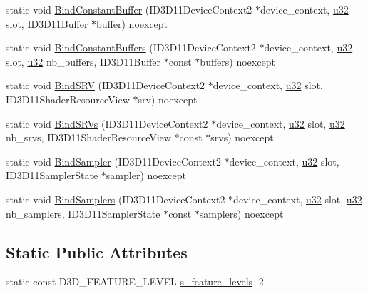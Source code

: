 \begin{DoxyCompactItemize}
\item 
static void \hyperlink{structmage_1_1_pipeline_ab09c3e39d69dc1faf85b290ba457526e}{Bind\+Constant\+Buffer} (I\+D3\+D11\+Device\+Context2 $\ast$device\+\_\+context, \hyperlink{namespacemage_af2b398bf98eb10351f49cad73fe2cc73}{u32} slot, I\+D3\+D11\+Buffer $\ast$buffer) noexcept
\item 
static void \hyperlink{structmage_1_1_pipeline_a6e6c99365ad6fb786cb6050388cd507d}{Bind\+Constant\+Buffers} (I\+D3\+D11\+Device\+Context2 $\ast$device\+\_\+context, \hyperlink{namespacemage_af2b398bf98eb10351f49cad73fe2cc73}{u32} slot, \hyperlink{namespacemage_af2b398bf98eb10351f49cad73fe2cc73}{u32} nb\+\_\+buffers, I\+D3\+D11\+Buffer $\ast$const $\ast$buffers) noexcept
\item 
static void \hyperlink{structmage_1_1_pipeline_a3bd9f93ba005ee8f4b84c1b4c7b1d6b9}{Bind\+S\+RV} (I\+D3\+D11\+Device\+Context2 $\ast$device\+\_\+context, \hyperlink{namespacemage_af2b398bf98eb10351f49cad73fe2cc73}{u32} slot, I\+D3\+D11\+Shader\+Resource\+View $\ast$srv) noexcept
\item 
static void \hyperlink{structmage_1_1_pipeline_ac1abd598eb8e07a72a1968f9c5c7e494}{Bind\+S\+R\+Vs} (I\+D3\+D11\+Device\+Context2 $\ast$device\+\_\+context, \hyperlink{namespacemage_af2b398bf98eb10351f49cad73fe2cc73}{u32} slot, \hyperlink{namespacemage_af2b398bf98eb10351f49cad73fe2cc73}{u32} nb\+\_\+srvs, I\+D3\+D11\+Shader\+Resource\+View $\ast$const $\ast$srvs) noexcept
\item 
static void \hyperlink{structmage_1_1_pipeline_a6798b32f4c762a4596eabddfc9ae73f7}{Bind\+Sampler} (I\+D3\+D11\+Device\+Context2 $\ast$device\+\_\+context, \hyperlink{namespacemage_af2b398bf98eb10351f49cad73fe2cc73}{u32} slot, I\+D3\+D11\+Sampler\+State $\ast$sampler) noexcept
\item 
static void \hyperlink{structmage_1_1_pipeline_a9fa053a9ae8cdaf0b966dc72103bfc44}{Bind\+Samplers} (I\+D3\+D11\+Device\+Context2 $\ast$device\+\_\+context, \hyperlink{namespacemage_af2b398bf98eb10351f49cad73fe2cc73}{u32} slot, \hyperlink{namespacemage_af2b398bf98eb10351f49cad73fe2cc73}{u32} nb\+\_\+samplers, I\+D3\+D11\+Sampler\+State $\ast$const $\ast$samplers) noexcept
\end{DoxyCompactItemize}
\subsection*{Static Public Attributes}
\begin{DoxyCompactItemize}
\item 
static const D3\+D\+\_\+\+F\+E\+A\+T\+U\+R\+E\+\_\+\+L\+E\+V\+EL \hyperlink{structmage_1_1_pipeline_a2b8c39e47ee583beb55fa1a8741deb4a}{s\+\_\+feature\+\_\+levels} \mbox{[}2\mbox{]}
\end{DoxyCompactItemize}
